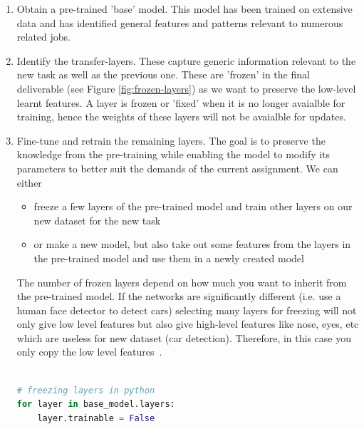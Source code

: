 \documentclass[11pt]{article}
\begin{document}
\begin{enumerate}
    \item Obtain a pre-trained 'base' model. This model has been trained on extensive data and has identified general features and patterns relevant to numerous related jobs.
    \item Identify the transfer-layers. These capture generic information relevant to the new task as well as the previous one. These are 'frozen' in the final deliverable (see Figure \ref{fig:frozen-layers}) as we want to preserve the low-level learnt features. A layer is frozen or 'fixed' when it is no longer avaialble for training, hence the weights of these layers will not be avaialble for updates.
    \item Fine-tune and retrain the remaining layers. The goal is to preserve the knowledge from the pre-training while enabling the model to modify its parameters to better suit the demands of the current assignment. We can either
          \begin{itemize}
              \item freeze a few layers of the pre-trained model and train other layers on our new dataset for the new task
              \item or make a new model, but also take out some features from the layers in the pre-trained model and use them in a newly created model
          \end{itemize}
          The number of frozen layers depend on how much you want to inherit from the pre-trained model. If the networks are significantly different (i.e. use a human face detector to detect cars) selecting many layers for freezing will not only give low level features but also give high-level features like nose, eyes, etc which are useless for new dataset (car detection). Therefore, in this case you only copy the low level features~\cite{geeks-transfer-learning}.

          \begin{lstlisting}[language=python] 
        
# freezing layers in python
for layer in base_model.layers: 
    layer.trainable = False

    \end{lstlisting}
\end{enumerate}
\end{document}
